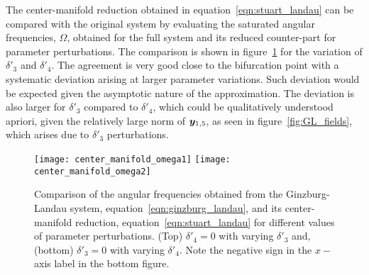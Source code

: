 The center-manifold reduction obtained in equation~\eqref{eqn:stuart_landau} can be compared with the original system by evaluating the saturated angular frequencies, $\Omega$, obtained for the full system and its reduced counter-part for parameter perturbations. The comparison is shown in figure~\ref{fig:omega_parameter_variation} for the variation of $\delta'_{3}$ and $\delta'_{4}$. The agreement is very good close to the bifurcation point with a systematic deviation arising at larger parameter variations. Such deviation would be expected given the asymptotic nature of the approximation. The deviation is also larger for $\delta'_{3}$ compared to $\delta'_{4}$, which could be qualitatively understood apriori, given the relatively large norm of $\boldsymbol{y}_{1,5}$, as seen in figure~\ref{fig:GL_fields}, which arises due to $\delta'_{3}$ perturbations. 
\begin{figure}
	\centering
	\texttt{[image: center\_manifold\_omega1]}
	\texttt{[image: center\_manifold\_omega2]}
	\caption{Comparison of the angular frequencies obtained from the Ginzburg-Landau system, equation~\eqref{eqn:ginzburg_landau}, and its center-manifold reduction, equation~\eqref{eqn:stuart_landau} for different values of parameter perturbations. (Top) $\delta'_{4} = 0$ with varying $\delta'_{3}$ and, (bottom) $\delta'_{3} = 0$ with varying $\delta'_{4}$. Note the negative sign in the $x-$axis label in the bottom figure.}
	\label{fig:omega_parameter_variation}
\end{figure} 



